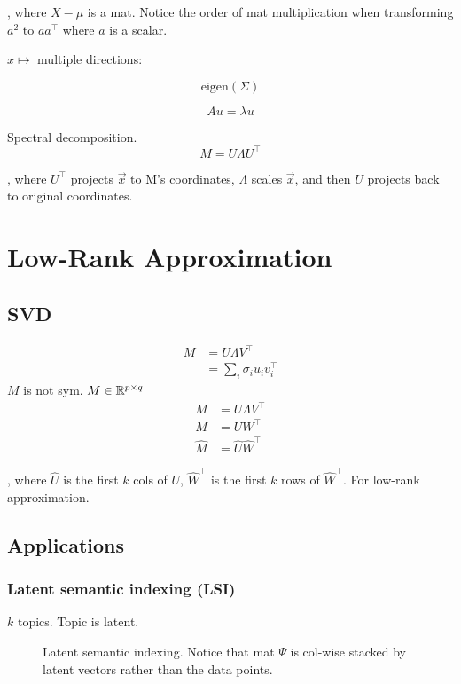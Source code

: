 \documentclass[a4paper]{report}
\begin{document}
, where $X-\mu$ is a mat. Notice the order of mat multiplication when transforming $a^2$ to $aa^\top$ where $a$ is a scalar.

$x \mapsto$ multiple directions:

$$
\text{eigen}(\Sigma)
$$

$$
Au = \lambda u
$$

Spectral decomposition. 
$$
M = U\Lambda U^\top
$$

, where $U^\top$ projects $\vec x$ to M's coordinates, $\Lambda$ scales $\vec x$, and then  $U$ projects back to original coordinates.
\section{Low-Rank Approximation}
\subsection{SVD}
\begin{align*}
M &= U\Lambda V^\top  \\
&= \sum_i \sigma_i u_i v_i^\top
\end{align*}
$M$ is not sym. $M\in \mathbb{R}^{p\times q}$
\begin{align*}
M &= U \Lambda V^\top \\
M &=UW^\top \\
\hat M &=\hat U \hat W^\top
\end{align*}

, where $\hat U$ is the first $k$ cols of $U$, $\hat W^\top$ is the first $k$ rows of $\hat W^\top$. For low-rank approximation. 

\subsection{Applications}
\subsubsection{Latent semantic indexing (LSI)}
$k$ topics. Topic is latent.

\begin{figure}[!htp]
\centering
{}
\caption{Latent semantic indexing. Notice that mat $\Psi$ is col-wise stacked by latent vectors rather than the data points. }
\label{fig:lsi}
\end{figure}
\end{document}
